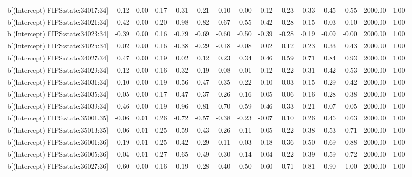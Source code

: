 \begin{table}[ht]
\begin{tabular}{rrrrrrrrrrrrrrr}
  b[(Intercept) FIPS:state:34017:34] & 0.12 & 0.00 & 0.17 & -0.31 & -0.21 & -0.10 & -0.00 & 0.12 & 0.23 & 0.33 & 0.45 & 0.55 & 2000.00 & 1.00 \\ 
  b[(Intercept) FIPS:state:34021:34] & -0.42 & 0.00 & 0.20 & -0.98 & -0.82 & -0.67 & -0.55 & -0.42 & -0.28 & -0.15 & -0.03 & 0.10 & 2000.00 & 1.00 \\ 
  b[(Intercept) FIPS:state:34023:34] & -0.39 & 0.00 & 0.16 & -0.79 & -0.69 & -0.60 & -0.50 & -0.39 & -0.28 & -0.19 & -0.09 & -0.00 & 2000.00 & 1.00 \\ 
  b[(Intercept) FIPS:state:34025:34] & 0.02 & 0.00 & 0.16 & -0.38 & -0.29 & -0.18 & -0.08 & 0.02 & 0.12 & 0.23 & 0.33 & 0.43 & 2000.00 & 1.00 \\ 
  b[(Intercept) FIPS:state:34027:34] & 0.47 & 0.00 & 0.19 & -0.02 & 0.12 & 0.23 & 0.34 & 0.46 & 0.59 & 0.71 & 0.84 & 0.93 & 2000.00 & 1.00 \\ 
  b[(Intercept) FIPS:state:34029:34] & 0.12 & 0.00 & 0.16 & -0.32 & -0.19 & -0.08 & 0.01 & 0.12 & 0.22 & 0.31 & 0.42 & 0.53 & 2000.00 & 1.00 \\ 
  b[(Intercept) FIPS:state:34031:34] & -0.10 & 0.00 & 0.19 & -0.56 & -0.47 & -0.35 & -0.22 & -0.10 & 0.03 & 0.15 & 0.29 & 0.42 & 2000.00 & 1.00 \\ 
  b[(Intercept) FIPS:state:34035:34] & -0.05 & 0.00 & 0.17 & -0.47 & -0.37 & -0.26 & -0.16 & -0.05 & 0.06 & 0.16 & 0.28 & 0.38 & 2000.00 & 1.00 \\ 
  b[(Intercept) FIPS:state:34039:34] & -0.46 & 0.00 & 0.19 & -0.96 & -0.81 & -0.70 & -0.59 & -0.46 & -0.33 & -0.21 & -0.07 & 0.05 & 2000.00 & 1.00 \\ 
  b[(Intercept) FIPS:state:35001:35] & -0.06 & 0.01 & 0.26 & -0.72 & -0.57 & -0.38 & -0.23 & -0.07 & 0.10 & 0.26 & 0.46 & 0.63 & 2000.00 & 1.00 \\ 
  b[(Intercept) FIPS:state:35013:35] & 0.06 & 0.01 & 0.25 & -0.59 & -0.43 & -0.26 & -0.11 & 0.05 & 0.22 & 0.38 & 0.53 & 0.71 & 2000.00 & 1.00 \\ 
  b[(Intercept) FIPS:state:36001:36] & 0.19 & 0.01 & 0.25 & -0.42 & -0.29 & -0.11 & 0.03 & 0.18 & 0.36 & 0.50 & 0.69 & 0.88 & 2000.00 & 1.00 \\ 
  b[(Intercept) FIPS:state:36005:36] & 0.04 & 0.01 & 0.27 & -0.65 & -0.49 & -0.30 & -0.14 & 0.04 & 0.22 & 0.39 & 0.59 & 0.72 & 2000.00 & 1.00 \\ 
  b[(Intercept) FIPS:state:36027:36] & 0.60 & 0.00 & 0.16 & 0.19 & 0.28 & 0.40 & 0.50 & 0.60 & 0.71 & 0.81 & 0.90 & 1.00 & 2000.00 & 1.00 \\ 

\end{tabular}
\end{table}
